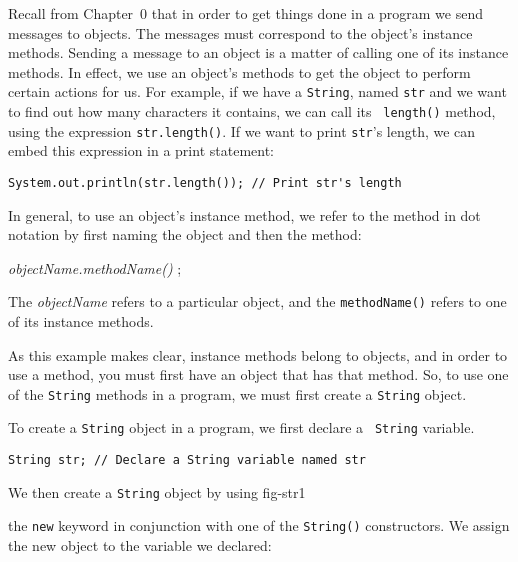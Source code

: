 Recall from Chapter~0 that in order to get things done in a program we
send messages to objects. The messages must correspond to the object's
instance methods. Sending a message to an object is a matter of
calling one of its instance methods.  In effect, we use an object's
methods to get the object to perform certain actions for us. For
example, if we have a {\tt String}, named {\tt str} and we want to
find out how many characters it contains, we can call its {\tt
length()} method, using the expression {\tt str.length()}. If we
want to print {\tt str}'s length, we can embed this expression in
a print statement:

\begin{jjjlisting}
\begin{lstlisting}
System.out.println(str.length()); // Print str's length
\end{lstlisting}
\end{jjjlisting}

\noindent In general, to use an object's instance method, we refer 
to the method in dot notation by first naming the object and then the
method:

\begin{extract}
{\it objectName.methodName()} ;
\end{extract}

\noindent The {\it objectName} refers to a particular object,
and the {\tt methodName()} refers to one of its instance methods.

As this example makes clear, instance methods belong to objects, and
in order to use a method, you must first have an object that has that
method. So, to use one of the {\tt String} methods in a program, we must
first create a {\tt String} object. 

To create a {\tt String} object in a program, we first declare a {\tt
String} variable.

\begin{jjjlisting}
\begin{lstlisting}
String str; // Declare a String variable named str
\end{lstlisting}
\end{jjjlisting}

\noindent We then create a {\tt String} object by using
{fig-str1}

the {\tt new} keyword in conjunction with one of the {\tt String()}
constructors. We assign the new object to the variable we declared:

